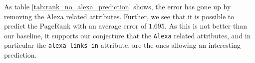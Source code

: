 As table \ref{tab:rank_no_alexa_prediction} shows, the error has gone up by removing the Alexa related attributes. Further, we see that it is possible to predict the PageRank with an average error of $1.695$. As this is not better than our baseline, it supports our conjecture that the \texttt{Alexa} related attributes, and in particular the \texttt{alexa\_links\_in} attribute, are the ones allowing an interesting prediction.